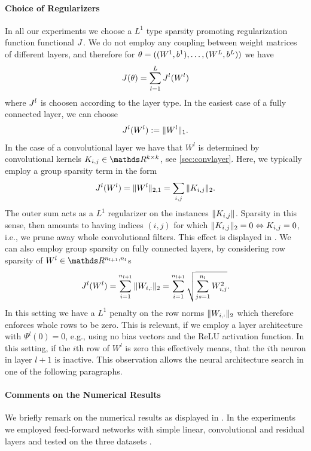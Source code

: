 \paragraph{Choice of Regularizers}
%
In all our experiments we choose a $L^1$ type sparsity promoting regularization function functional $J$. We do not employ any coupling between weight matrices of different layers, and therefore for $\theta=((W^1,b^1),\ldots, (W^L,b^L))$ we have
%
\begin{align*}
J(\theta) = \sum_{l=1}^L J^l(W^l)
\end{align*}
%
%
where $J^l$ is choosen according to the layer type. In the easiest case of a fully connected layer, we can choose
%
\begin{align*}
J^l(W^l) := \|W^l\|_1.
\end{align*}
%
In the case of a convolutional layer we have that $W^l$ is determined by convolutional kernels $K_{i,j}\in\R^{k\times k}$, see \cref{sec:convlayer}. Here, we typically employ a group sparsity term in the form
%
\begin{align*}
J^l(W^l) = \|W^l\|_{2,1} = \sum_{i,j} \|K_{i,j}\|_2.
\end{align*}
%
The outer sum acts as a $L^1$ regularizer on the instances $\|K_{i,j}\|$. Sparsity in this sense, then amounts to having indices $(i,j)$ for which $\|K_{i,j}\|_2=0 \Leftrightarrow K_{i,j}=0$, i.e., we prune away whole convolutional filters. This effect is displayed in \cite[Fig. 1]{bungert2022bregman}.
We can also employ group sparsity on fully connected layers, by considering row sparsity of $W^l\in\R^{n_{l+1}, n_l}$s
%
\begin{align*}
J^l(W^l) = \sum_{i=1}^{n_{l+1}} \|W_{i,:}\|_2 = \sum_{i=1}^{n_{l+1}} \sqrt{\sum_{js=1}^{n_{l}} W_{i,j}^2}.
\end{align*}
%
%
%
In this setting we have a $L^1$ penalty on the row norms $\|W_{i,:}\|_2$ which therefore enforces whole rows to be zero. This is relevant, if we employ a layer architecture with $\Psi^l(0)=0$, e.g., using no bias vectors and the ReLU activation function. In this setting, if the $i$th row of $W^l$ is zero this effectively means, that the $i$th neuron in layer $l+1$ is inactive. This observation allows the neural architecture search in one of the following paragraphs.
\paragraph{Comments on the Numerical Results} We briefly remark on the numerical results as displayed in \cite[Sec. 4]{bungert2022bregman}. In the experiments we employed feed-forward networks with simple linear, convolutional and residual layers and tested on the three datasets \cite{krizhevsky2009learning, Han17, leCun10}.

